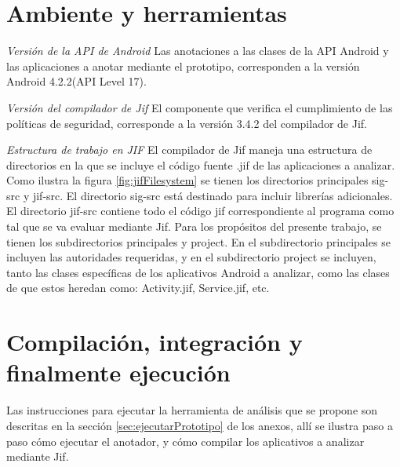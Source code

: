 \section{Ambiente y herramientas}
\textit{Versión de la API de Android}\newline
Las anotaciones a las clases de la API Android y las aplicaciones a anotar
mediante el prototipo, corresponden a la versión Android 4.2.2(API Level 17).

\textit{Versión del compilador de Jif}\newline
El componente que verifica el cumplimiento de las políticas de seguridad,
corresponde a la versión 3.4.2 del compilador de Jif.

\textit{Estructura de trabajo en JIF}\newline
El compilador de Jif maneja una estructura de directorios en la que se incluye
el código fuente .jif de las aplicaciones a analizar. Como ilustra la figura
\ref{fig:jifFilesystem} se tienen los directorios principales sig-src y jif-src.
El directorio sig-src está destinado para incluir librerías adicionales.\newline 
El directorio jif-src contiene todo el código jif correspondiente al programa
como tal que se va evaluar mediante Jif. Para los propósitos del presente
trabajo, se tienen los subdirectorios principales y project. En el subdirectorio
principales se incluyen las autoridades requeridas, y en el subdirectorio
project se incluyen, tanto las clases específicas de los aplicativos Android a
analizar, como las clases de que estos heredan como: Activity.jif, Service.jif,
etc.

\section{Compilación, integración y finalmente ejecución }
Las instrucciones para ejecutar la herramienta de análisis que se propone son
descritas en la sección \ref{sec:ejecutarPrototipo} de los anexos, allí se
ilustra paso a paso cómo ejecutar el anotador, y cómo compilar los aplicativos
a analizar mediante Jif.
